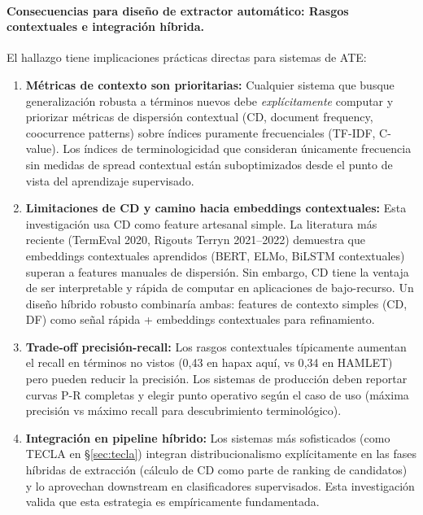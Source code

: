 \paragraph{Consecuencias para diseño de extractor automático: Rasgos contextuales e integración híbrida.}

El hallazgo tiene implicaciones prácticas directas para sistemas de ATE:

\begin{enumerate}
    \item \textbf{Métricas de contexto son prioritarias:} Cualquier sistema que busque generalización robusta a términos nuevos debe \emph{explícitamente} computar y priorizar métricas de dispersión contextual (CD, document frequency, coocurrence patterns) sobre índices puramente frecuenciales (TF-IDF, C-value). Los índices de terminologicidad que consideran únicamente frecuencia sin medidas de spread contextual están suboptimizados desde el punto de vista del aprendizaje supervisado.

    \item \textbf{Limitaciones de CD y camino hacia embeddings contextuales:} Esta investigación usa CD como feature artesanal simple. La literatura más reciente (TermEval 2020, Rigouts Terryn 2021--2022) demuestra que embeddings contextuales aprendidos (BERT, ELMo, BiLSTM contextuales) superan a features manuales de dispersión. Sin embargo, CD tiene la ventaja de ser interpretable y rápida de computar en aplicaciones de bajo-recurso. Un diseño híbrido robusto combinaría ambas: features de contexto simples (CD, DF) como señal rápida + embeddings contextuales para refinamiento.

    \item \textbf{Trade-off precisión-recall:} Los rasgos contextuales típicamente aumentan el recall en términos no vistos (0{,}43 en hapax aquí, vs 0{,}34 en HAMLET) pero pueden reducir la precisión. Los sistemas de producción deben reportar curvas P-R completas y elegir punto operativo según el caso de uso (máxima precisión vs máximo recall para descubrimiento terminológico).

    \item \textbf{Integración en pipeline híbrido:} Los sistemas más sofisticados (como TECLA en §\ref{sec:tecla}) integran distribucionalismo explícitamente en las fases híbridas de extracción (cálculo de CD como parte de ranking de candidatos) y lo aprovechan downstream en clasificadores supervisados. Esta investigación valida que esta estrategia es empíricamente fundamentada.
\end{enumerate}

